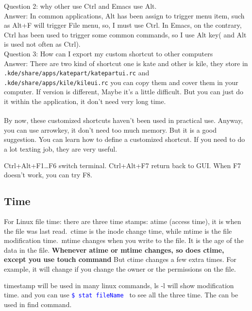 \documentclass[paper=8.5in:11in, twoside, 12pt, pagesize=pdftex]{book}
\newcommand{\linuxcommand}[1]{\texttt{\textcolor{blue}{\$ #1 \Pisymbol{psy}{191}}}}
\begin{document}
	Question 2: why other use Ctrl and Emacs use Alt. \\
	Answer: In common applications, Alt has been assign to trigger menu item, such as Alt+F will trigger File menu, so, I must use Ctrl. In Emacs, on the contrary,
	Ctrl has been used to trigger some common commands, so I use Alt key( and Alt is used not often as Ctrl).\\

	Question 3: How can I export my custom shortcut to other computers \\
	Answer: There are two kind of shortcut one is kate and other is kile, they store in \verb=.kde/share/apps/katepart/katepartui.rc= and \linebreak[4] \verb=.kde/share/apps/kile/kileui.rc=
	you can copy them and cover them in your computer. If version is different, Maybe it's a little difficult. But you can just do it within the application, it don't need very long time. \\
        \\
	By now, these customized shortcuts haven't been used in practical use. Anyway, you can use arrowkey, it don't need too much memory. But it is a good suggestion. You can learn how to define a customized shortcut. If you need to do a lot texting job, they are very useful.
	 
	 
  Ctrl+Alt+F1\ldots F6 switch terminal. Ctrl+Alt+F7 return back to GUI\@. When F7 doesn't work, you can try F8. 



\subsection{Time}

		For Linux file time: there are three time stamps: atime (access time), it is when the file was last read.\  ctime is the inode change time, while mtime is the file modification time.\  mtime changes when you write to the file. It is the age of the data in the file. \textbf{Whenever atime or mtime changes, so does ctime, except you use touch command} But ctime changes a few extra times. For example, it will change if you change the owner or the permissions on the file.  

		timestamp will be used in many linux commands, ls -l will show modification time. and you can use \linuxcommand{stat fileName} to see all the three time. The can be used in find command. 
\end{document}
